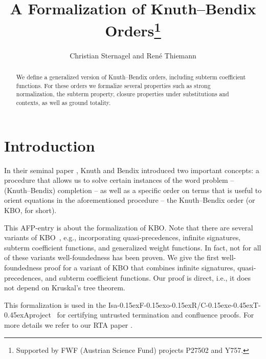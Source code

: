 \documentclass[11pt,a4paper]{article}
\newcommand\isafor{\textsf{Isa\kern-0.15exF\kern-0.15exo\kern-0.15exR}}
\newcommand\ceta{\textsf{C\kern-0.15exe\kern-0.45exT\kern-0.45exA}}
\begin{document}
\title{A Formalization of Knuth--Bendix Orders\footnote{Supported by FWF (Austrian Science Fund) projects P27502 and Y757.}}
\author{Christian Sternagel and Ren\'e Thiemann}
\maketitle

\begin{abstract}
We define a generalized version of Knuth--Bendix orders, including
subterm coefficient functions. For these orders we formalize several
properties such as strong normalization, the subterm property, closure properties
under substitutions and contexts, as well as ground totality.
\end{abstract}

\tableofcontents

\section{Introduction}

In their seminal paper \cite{KB70}, Knuth and Bendix introduced two important
concepts: a procedure that allows us to solve certain instances of the word
problem -- (Knuth--Bendix) completion -- as well as a specific
order on terms that is useful to orient equations in the aforementioned
procedure -- the Knuth--Bendix order (or KBO, for short).

This AFP-entry is about the formalization of KBO.
Note that there are several variants of KBO~\cite{KB70,DKM90,LW07,ZHM09,S89}, e.g., incorporating quasi-precedences,
infinite signatures, subterm coefficient functions, and generalized 
weight functions. In fact, not for all of these variants well-foundedness has been
proven.
We give
the first well-foundedness proof for a variant of KBO that combines 
infinite signatures, quasi-precedences, and subterm coefficient functions.
Our proof is direct, i.e., it does not depend on Kruskal's tree
theorem.

This formalization is used in the \isafor/\ceta project~\cite{TS09b} for certifying untrusted
termination and confluence proofs. For more details we refer to our RTA paper \cite{paper}.







\end{document}
